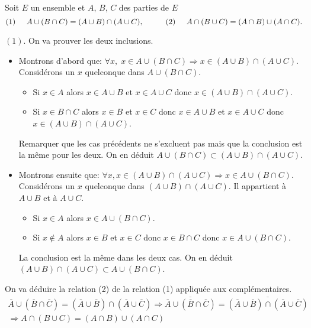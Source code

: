 \begin{prop}
  Soit $E$ un ensemble et $A$, $B$, $C$ des parties de $E$
\begin{displaymath}
  (1)\hspace{0.5cm} A\cup(B\cap C) = (A\cup B) \cap (A\cup C), \hspace{1cm}
  (2)\hspace{0.5cm} A\cap(B\cup C) = (A\cap B) \cup (A\cap C).
\end{displaymath}
\end{prop}
\begin{demo}
$(1)$. On va prouver les deux inclusions.
\begin{itemize}
  \item Montrons d'abord que: $\forall x,\; x\in A \cup(B\cap C) \Rightarrow x \in (A\cup B) \cap (A\cup C)$. \newline
  Considérons un $x$ quelconque dans $A \cup(B\cap C)$.
  \begin{itemize}
    \item Si $x\in A$ alors $x\in A\cup B$ et $x\in A\cup C$ donc $x \in (A\cup B) \cap (A\cup C)$.
    \item Si $x\in B\cap C$ alors $x\in B$ et $x\in C$ donc $x\in A\cup B$ et $x\in A\cup C$ donc $x \in (A\cup B) \cap (A\cup C)$.
  \end{itemize}
Remarquer que les cas précédents ne s'excluent pas mais que la conclusion est la même pour les deux. On en déduit $A \cup(B\cap C) \subset (A\cup B) \cap (A\cup C)$. 
  \item Montrons ensuite que: $\forall x,  x \in (A\cup B) \cap (A\cup C) \Rightarrow x\in A \cup(B\cap C)$. \newline
  Considérons un $x$ quelconque dans $(A\cup B) \cap (A\cup C)$. Il appartient à $A\cup B$ et à $A\cup C$.
  \begin{itemize}
    \item Si $x\in A$ alors $x\in A \cup(B\cap C)$.
    \item Si $x\notin A$ alors $x\in B$ et $x\in C$ donc $x\in B\cap C$ donc $x\in A \cup (B\cap C)$.
  \end{itemize}
La conclusion est la même dans les deux cas. On en déduit $(A\cup B) \cap (A\cup C) \subset A \cup(B\cap C)$.
\end{itemize}
On va déduire la relation (2) de la relation (1) appliquée aux complémentaires.
\begin{multline*}
\overline{A}\cup(\overline{B}\cap \overline{C}) = (\overline{A}\cup \overline{B}) \cap (\overline{A}\cup \overline{C}) 
\Rightarrow
\overline{\overline{A}\cup(\overline{B}\cap \overline{C})}
= \overline{(\overline{A}\cup \overline{B}) \cap (\overline{A}\cup \overline{C})} \\
\Rightarrow A \cap (B\cup C) = (A\cap B) \cup (A \cap C)
\end{multline*}
\end{demo}


